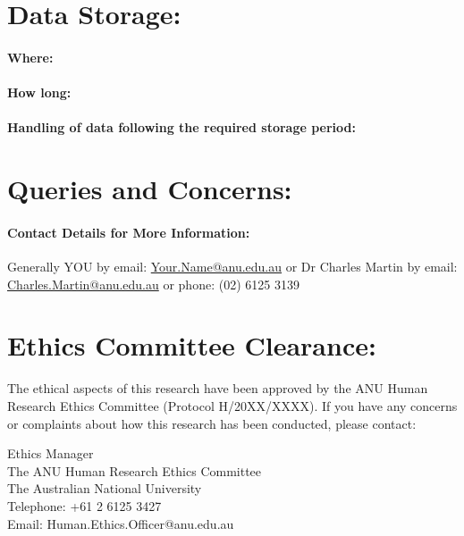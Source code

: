 \documentclass[11pt, a4paper, oneside]{article}
\begin{document}
\section{Data Storage:}

\paragraph{Where:} 

\paragraph{How long:} 

\paragraph{Handling of data following the required storage period:} 



\section{Queries and Concerns:}

\paragraph{Contact Details for More Information:} Generally YOU by email: \url{Your.Name@anu.edu.au} or Dr Charles Martin by email: \url{Charles.Martin@anu.edu.au} or phone: (02) 6125 3139



\section{Ethics Committee Clearance:}

The ethical aspects of this research have been approved by the ANU Human Research Ethics Committee (Protocol H/20XX/XXXX). 
If you have any concerns or complaints about how this research has been conducted, please contact:

\vspace{0.5cm}

\indent Ethics Manager\\
\indent The ANU Human Research Ethics Committee\\
\indent The Australian National University\\
\indent Telephone: +61 2 6125 3427\\
\indent Email: Human.Ethics.Officer@anu.edu.au
\end{document}

